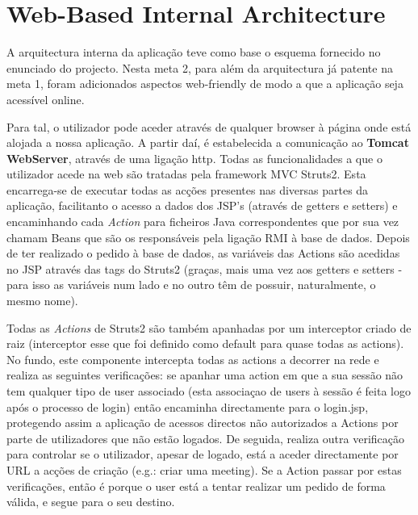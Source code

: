\documentclass[12pt]{article} %
\begin{document}
\section{Web-Based Internal Architecture}
\label{sub:internal}

A arquitectura interna da aplicação teve como base o esquema fornecido no enunciado do projecto. Nesta meta 2, para além da arquitectura já patente na meta 1, foram adicionados aspectos web-friendly de modo a que a aplicação seja acessível online. 

Para tal, o utilizador pode aceder através de qualquer browser à página onde está alojada a nossa aplicação. A partir daí, é estabelecida a comunicação ao \textbf{Tomcat WebServer}, através de uma ligação http. Todas as funcionalidades a que o utilizador acede na web são tratadas pela framework MVC Struts2. Esta encarrega-se de executar todas as acções presentes nas diversas partes da aplicação, facilitanto o acesso a dados dos JSP's (através de getters e setters) e encaminhando cada \emph{Action} para ficheiros Java correspondentes que por sua vez chamam Beans que são os responsáveis pela ligação RMI à base de dados. Depois de ter realizado o pedido à base de dados, as variáveis das Actions são acedidas no JSP através das tags do Struts2 (graças, mais uma vez aos getters e setters - para isso as variáveis num lado e no outro têm de possuir, naturalmente, o mesmo nome).

Todas as \emph{Actions} de Struts2 são também apanhadas por um interceptor criado de raiz (interceptor esse que foi definido como default para quase todas as actions). No fundo, este componente intercepta todas as actions a decorrer na rede e realiza as seguintes verificações: se apanhar uma action em que a sua sessão não tem qualquer tipo de user associado (esta associaçao de users à sessão é feita logo após o processo de login) então encaminha directamente para o login.jsp, protegendo assim a aplicação de acessos directos não autorizados a Actions por parte de utilizadores que não estão logados. De seguida, realiza outra verificação para controlar se o utilizador, apesar de logado, está a aceder directamente por URL a acções de criação (e.g.: criar uma meeting). Se a Action passar por estas verificações, então é porque o user está a tentar realizar um pedido de forma válida, e segue para o seu destino.
\end{document}
